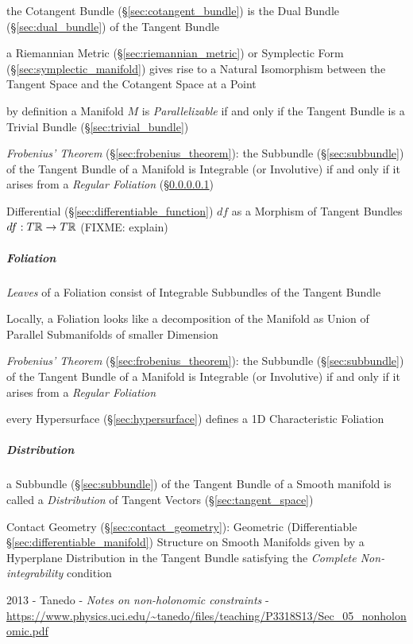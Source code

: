 the Cotangent Bundle (\S\ref{sec:cotangent_bundle}) is the Dual Bundle
(\S\ref{sec:dual_bundle}) of the Tangent Bundle

a Riemannian Metric (\S\ref{sec:riemannian_metric}) or Symplectic Form
(\S\ref{sec:symplectic_manifold}) gives rise to a Natural Isomorphism between
the Tangent Space and the Cotangent Space at a Point

by definition a Manifold $M$ is \emph{Parallelizable} if and only if the
Tangent Bundle is a Trivial Bundle (\S\ref{sec:trivial_bundle})

\emph{Frobenius' Theorem} (\S\ref{sec:frobenius_theorem}): the Subbundle
(\S\ref{sec:subbundle}) of the Tangent Bundle of a Manifold is Integrable (or
Involutive) if and only if it arises from a \emph{Regular Foliation}
(\S\ref{sec:foliation})

Differential (\S\ref{sec:differentiable_function}) $df$ as a Morphism of
Tangent Bundles $df : T\mathbb{R} \rightarrow T\mathbb{R}$ (FIXME: explain)



\subparagraph{Foliation}\label{sec:foliation}\hfill

\emph{Leaves} of a Foliation consist of Integrable Subbundles of the Tangent
Bundle

Locally, a Foliation looks like a decomposition of the Manifold as Union of
Parallel Submanifolds of smaller Dimension

\emph{Frobenius' Theorem} (\S\ref{sec:frobenius_theorem}): the Subbundle
(\S\ref{sec:subbundle}) of the Tangent Bundle of a Manifold is Integrable (or
Involutive) if and only if it arises from a \emph{Regular Foliation}

every Hypersurface (\S\ref{sec:hypersurface}) defines a 1D Characteristic
Foliation



\subparagraph{Distribution}\label{sec:tangent_bundle_distribution}\hfill

a Subbundle (\S\ref{sec:subbundle}) of the Tangent Bundle of a Smooth manifold
is called a \emph{Distribution} of Tangent Vectors (\S\ref{sec:tangent_space})

\fist Contact Geometry (\S\ref{sec:contact_geometry}): Geometric (Differentiable
\S\ref{sec:differentiable_manifold}) Structure on Smooth Manifolds given by a
Hyperplane Distribution in the Tangent Bundle satisfying the \emph{Complete
  Non-integrability} condition

2013 - Tanedo - \emph{Notes on non-holonomic constraints} -
\url{https://www.physics.uci.edu/~tanedo/files/teaching/P3318S13/Sec_05_nonholonomic.pdf}

